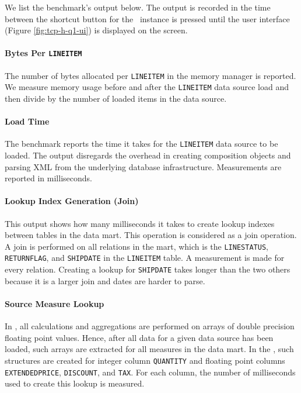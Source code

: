 We list the benchmark's output below. The output is recorded in the time between the shortcut button for the \gd~instance is pressed until the user interface (Figure \ref{fig:tcp-h-q1-ui}) is displayed on the screen.

\paragraph{Bytes Per \texttt{LINEITEM}}

The number of bytes allocated per \texttt{LINEITEM} in the memory manager is reported. We measure memory usage before and after the \texttt{LINEITEM} data source load and then divide by the number of loaded items in the data source.

\paragraph{Load Time}

The benchmark reports the time it takes for the \texttt{LINEITEM} data source to be loaded. The output disregards the overhead in creating composition objects and parsing XML from the underlying database infrastructure. Measurements are reported in milliseconds.

\paragraph{Lookup Index Generation (Join)}

This output shows how many milliseconds it takes to create lookup indexes between tables in the data mart. This operation is considered as a join operation. A join is performed on all relations in the mart, which is the \texttt{LINESTATUS}, \texttt{RETURNFLAG}, and \texttt{SHIPDATE} in the \texttt{LINEITEM} table. A measurement is made for every relation. Creating a lookup for \texttt{SHIPDATE} takes longer than the two others because it is a larger join and dates are harder to parse.

\paragraph{Source Measure Lookup}

In \gd, all calculations and aggregations are performed on arrays of double precision floating point values. Hence, after all data for a given data source has been loaded, such arrays are extracted for all measures in the data mart. In the \tpchdl, such structures are created for integer column \texttt{QUANTITY} and floating point columns \texttt{EXTENDEDPRICE}, \texttt{DISCOUNT}, and \texttt{TAX}. For each column, the number of milliseconds used to create this lookup is measured.


